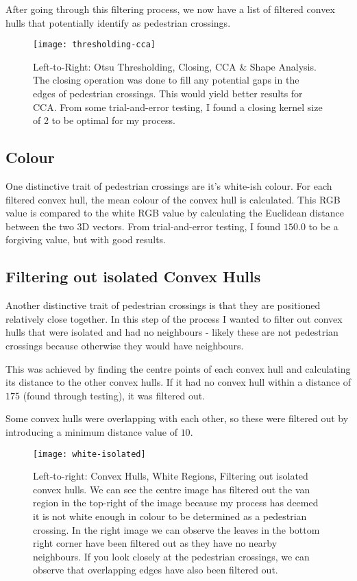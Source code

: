 \documentclass{article}  %
\begin{document}
	After going through this filtering process, we now have a list of filtered convex hulls that potentially identify as pedestrian crossings.
	
	\begin{figure}[H]
		\centering
		\texttt{[image: thresholding-cca]}
		\caption{Left-to-Right: Otsu Thresholding, Closing, CCA \& Shape Analysis. The closing operation was done to fill any potential gaps in the edges of pedestrian crossings. This would yield better results for CCA. From some trial-and-error testing, I found a closing kernel size of 2 to be optimal for my process.}
	\end{figure}

	\subsection{Colour}
	
	One distinctive trait of pedestrian crossings are it's white-ish colour. For each filtered convex hull, the mean colour of the convex hull is calculated. This RGB value is compared to the white RGB value by calculating the Euclidean distance between the two 3D vectors. From trial-and-error testing, I found $150.0$ to be a forgiving value, but with good results.
	
	\subsection{Filtering out isolated Convex Hulls}
	
	Another distinctive trait of pedestrian crossings is that they are positioned relatively close together. In this step of the process I wanted to filter out convex hulls that were isolated and had no neighbours - likely these are not pedestrian crossings because otherwise they would have neighbours.
	
	This was achieved by finding the centre points of each convex hull and calculating its distance to the other convex hulls. If it had no convex hull within a distance of $175$ (found through testing), it was filtered out.
	
	Some convex hulls were overlapping with each other, so these were filtered out by introducing a minimum distance value of $10$.
	
	\begin{figure}[H]
		\centering
		\texttt{[image: white-isolated]}
		\caption{Left-to-right: Convex Hulls, White Regions, Filtering out isolated convex hulls. We can see the centre image has filtered out the van region in the top-right of the image because my process has deemed it is not white enough in colour to be determined as a pedestrian crossing. In the right image we can observe the leaves in the bottom right corner have been filtered out as they have no nearby neighbours. If you look closely at the pedestrian crossings, we can observe that overlapping edges have also been filtered out.}
	\end{figure}
	
\end{document}
